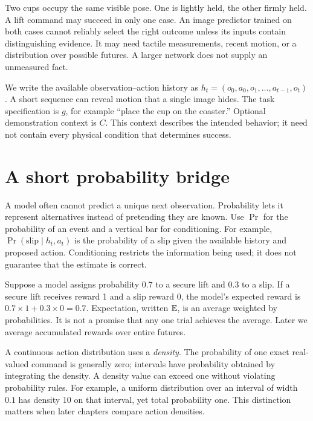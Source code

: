 Two cups occupy the same visible pose. One is lightly held, the other firmly held. A lift command may succeed in only one case. An image predictor trained on both cases cannot reliably select the right outcome unless its inputs contain distinguishing evidence. It may need tactile measurements, recent motion, or a distribution over possible futures. A larger network does not supply an unmeasured fact.

We write the available observation--action history as $h_t=(o_0,a_0,o_1,\ldots,a_{t-1},o_t)$. A short sequence can reveal motion that a single image hides. The task specification is $g$, for example ``place the cup on the coaster.'' Optional demonstration context is $C$. This context describes the intended behavior; it need not contain every physical condition that determines success.


\section{A short probability bridge}
A model often cannot predict a unique next observation. Probability lets it represent alternatives instead of pretending they are known. Use $\Pr$ for the probability of an event and a vertical bar for conditioning. For example, $\Pr(\text{slip}\mid h_t,a_t)$ is the probability of a slip given the available history and proposed action. Conditioning restricts the information being used; it does not guarantee that the estimate is correct.

Suppose a model assigns probability $0.7$ to a secure lift and $0.3$ to a slip. If a secure lift receives reward 1 and a slip reward 0, the model's expected reward is $0.7\times1+0.3\times0=0.7$. Expectation, written $\mathbb{E}$, is an average weighted by probabilities. It is not a promise that any one trial achieves the average. Later we average accumulated rewards over entire futures.

A continuous action distribution uses a \emph{density}. The probability of one exact real-valued command is generally zero; intervals have probability obtained by integrating the density. A density value can exceed one without violating probability rules. For example, a uniform distribution over an interval of width $0.1$ has density 10 on that interval, yet total probability one. This distinction matters when later chapters compare action densities.

